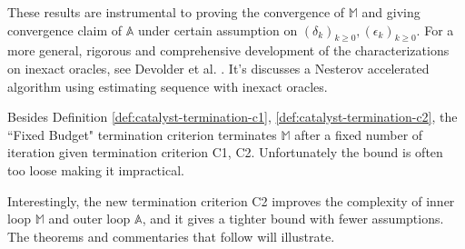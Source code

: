 \documentclass[12pt]{article}
\begin{document}
            These results are instrumental to proving the convergence of $\mathbb M$ and giving convergence claim of $\mathbb A$ under certain assumption on $(\delta_k)_{k \ge 0}, (\epsilon_k)_{k \ge0}$. 
            For a more general, rigorous and comprehensive development of the characterizations on inexact oracles, see Devolder et al. \cite{devolder_first-order_2014}. 
            It's discusses a Nesterov accelerated algorithm using estimating sequence with inexact oracles. 
            \par
            Besides Definition \ref{def:catalyst-termination-c1}, \ref{def:catalyst-termination-c2}, the ``Fixed Budget" termination criterion terminates $\mathbb M$ after a fixed number of iteration given termination criterion C1, C2. 
            Unfortunately the bound is often too loose making it impractical. 
            \par
            Interestingly, the new termination criterion C2 improves the complexity of inner loop $\mathbb M$ and outer loop $\mathbb A$, and it gives a tighter bound with fewer assumptions. 
            The theorems and commentaries that follow will illustrate. 
\end{document}
